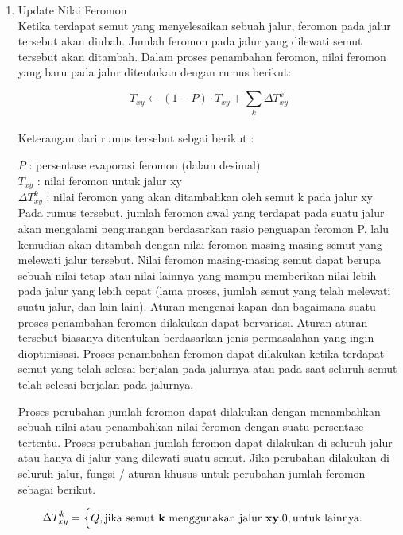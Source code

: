 \begin{enumerate}
	\item Update Nilai Feromon\\
	Ketika terdapat semut yang menyelesaikan sebuah jalur, feromon pada jalur tersebut akan diubah.
	Jumlah feromon pada jalur yang dilewati semut tersebut akan ditambah. Dalam proses penambahan
	feromon, nilai feromon yang baru pada jalur ditentukan dengan rumus berikut:
	
	\begin{equation}
	T_{xy} \leftarrow (1-P) \cdot T_{xy} + \sum_{k}\Delta T_{xy}^k
	\end{equation}\\
	
	Keterangan dari rumus tersebut sebgai berikut :
	
	$P$ : persentase evaporasi feromon (dalam desimal)\\
	$T_{xy}$ : nilai feromon untuk jalur xy\\
	$\Delta T_{xy}^k$ : nilai feromon yang akan ditambahkan oleh semut k pada jalur xy\\
	
	Pada rumus tersebut, jumlah feromon awal yang terdapat pada suatu jalur akan mengalami
	pengurangan berdasarkan rasio penguapan feromon P, lalu kemudian akan ditambah dengan nilai
	feromon masing-masing semut yang melewati jalur tersebut. Nilai feromon masing-masing semut
	dapat berupa sebuah nilai tetap atau nilai lainnya yang mampu memberikan nilai lebih pada jalur
	yang lebih cepat (lama proses, jumlah semut yang telah melewati suatu jalur, dan lain-lain).
	Aturan mengenai kapan dan bagaimana suatu proses penambahan feromon dilakukan dapat
	bervariasi. Aturan-aturan tersebut biasanya ditentukan berdasarkan jenis permasalahan yang ingin
	dioptimisasi. Proses penambahan feromon dapat dilakukan ketika terdapat semut yang telah selesai
	berjalan pada jalurnya atau pada saat seluruh semut telah selesai berjalan pada jalurnya. 
	
	Proses perubahan jumlah feromon dapat dilakukan dengan menambahkan sebuah nilai atau penambahkan
	nilai feromon dengan suatu persentase tertentu.
	Proses perubahan jumlah feromon dapat dilakukan di seluruh jalur atau hanya di jalur yang
	dilewati suatu semut. Jika perubahan dilakukan di seluruh jalur, fungsi / aturan khusus untuk
	perubahan jumlah feromon sebagai berikut.
	
	\begin{equation}
	\Delta T_{xy}^k = \begin{cases}
	Q, \mbox{jika semut {\bf k} menggunakan jalur {\bf xy}} .\newline
	0, \mbox{untuk lainnya}.
	\end{cases}
	\end{equation}\\
	

\end{enumerate}
